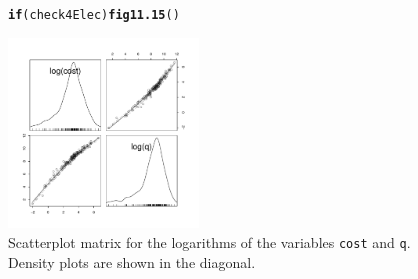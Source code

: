 \documentclass[12pt, a4paper,  BCOR=8.25mm, DIV=15]{scrartcl}\usepackage[]{graphicx}\usepackage[]{color}
\makeatletter
\newcommand{\hlstd}[1]{\textcolor[rgb]{0.345,0.345,0.345}{#1}}%
\newcommand{\hlkwa}[1]{\textcolor[rgb]{0.161,0.373,0.58}{\textbf{#1}}}%
\newcommand{\hlkwd}[1]{\textcolor[rgb]{0.737,0.353,0.396}{\textbf{#1}}}%
\newenvironment{kframe}{%
 \def\at@end@of@kframe{}%
 \ifinner\ifhmode%
  \def\at@end@of@kframe{\end{minipage}}%
  \begin{minipage}{\columnwidth}%
 \fi\fi%
 \def\FrameCommand##1{\hskip\@totalleftmargin \hskip-\fboxsep
 \colorbox{shadecolor}{##1}\hskip-\fboxsep
     \hskip-\linewidth \hskip-\@totalleftmargin \hskip\columnwidth}%
 \MakeFramed {\advance\hsize-\width
   \@totalleftmargin\z@ \linewidth\hsize
   \@setminipage}}%
 {\par\unskip\endMakeFramed%
 \at@end@of@kframe}
\newenvironment{knitrout}{}{} %
\newcommand{\txtt}[1]{{\texttt{#1}}}
\makeatother
\begin{document}
\begin{figure}[H]
\begin{knitrout}
\color{fgcolor}\begin{kframe}
\begin{alltt}
\hlkwa{if}\hlstd{(check4Elec)}\hlkwd{fig11.15}\hlstd{()}
\end{alltt}
\end{kframe}

{\centering \includegraphics[width=0.45\textwidth]{figs/reg-spm-cost-q-11_15-1} 

}



\end{knitrout}
  \caption{Scatterplot matrix for the logarithms of the variables
    \txtt{cost} and \txtt{q}. Density plots are shown in the
    diagonal.\label{fig:elec-dens}}
\end{figure}
\end{document}
